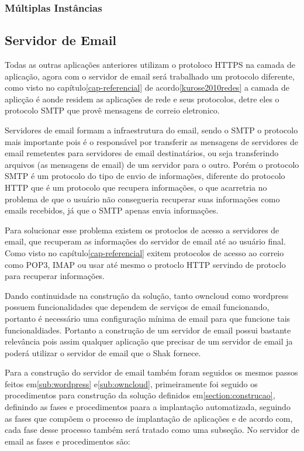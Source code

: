 \subsubsection{Múltiplas Instâncias}


\subsection{Servidor de Email}
\label{sub:email}

Todas as outras aplicações anteriores utilizam o protoloco
HTTPS na camada de aplicação, agora com o servidor de email será trabalhado um
protocolo diferente, como visto no capítulo\ref{cap-referencial}
de acordo\ref{kurose2010redes} a camada de aplicção é aonde residem  as aplicações
de rede e seus protocolos, detre eles o protocolo SMTP que provê mensagens de correio
eletronico.

Servidores de email formam a infraestrutura do email, sendo o SMTP o protocolo
mais importante pois é o responsável por transferir as mensagens de servidores
de email remetentes para servidores de email destinatários, ou seja transferindo
arquivos (as mensagens de email) de um servidor para o outro. Porém o protocolo
SMTP é um protocolo do tipo de envio de informações, diferente do protocolo HTTP
que é um protocolo que recupera informações, o que acarretria no problema de que
o usuário não consegueria recuperar suas informações como emails recebidos, já
que o SMTP apenas envia informações.

Para solucionar esse problema existem os protoclos de acesso a servidores de
email, que recuperam as informações do servidor de email até ao usuário final.
Como visto no capítulo\ref{cap-referencial} exitem protocolos de acesso ao correio
como POP3, IMAP ou usar até mesmo o protoclo HTTP servindo de protoclo para recuperar
informações.

Dando continuidade na construção da solução, tanto owncloud como wordpress
possuem funcionalidades que dependem de serviços de email funcionando, portanto
é necessário uma configuração mínima de email para que funcione tais funcionaldiades.
Portanto a construção de um servidor de email possui bastante relevância pois
assim qualquer aplicação que precisar de um servidor de email ja poderá utilizar
o servidor de email que o Shak fornece.

Para a construção do servidor de email também foram seguidos os mesmos passos
feitos em\ref{sub:wordpress} e\ref{sub:owncloud}, primeiramente foi seguido os
procedimentos para construção da solução definidos em\ref{section:construcao},
definindo as fases e procedimentos paara a implantação automatizada, seguindo as
fases que compõem o processo de implantação de aplicações e de acordo com\cite{omg2006},
cada fase desse processo também será tratado como uma subseção. No servidor de email
as fases e procedimentos são:

